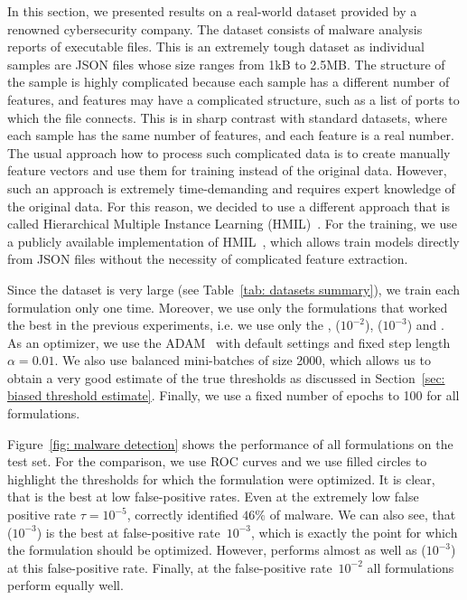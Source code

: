 In this section, we presented results on a real-world dataset provided by a renowned cybersecurity company. The dataset consists of malware analysis reports of executable files. This is an extremely tough dataset as individual samples are JSON files whose size ranges from 1kB to 2.5MB. The structure of the sample is highly complicated because each sample has a different number of features, and features may have a complicated structure, such as a list of ports to which the file connects. This is in sharp contrast with standard datasets, where each sample has the same number of features, and each feature is a real number. The usual approach how to process such complicated data is to create manually feature vectors and use them for training instead of the original data. However, such an approach is extremely time-demanding and requires expert knowledge of the original data. For this reason, we decided to use a different approach that is called Hierarchical Multiple Instance Learning (HMIL)~\cite{pevny2017using}. For the training, we use a publicly available implementation of HMIL~\cite{mandlik2021mill}, which allows train models directly from JSON files without the necessity of complicated feature extraction.

Since the dataset is very large (see Table~\ref{tab: datasets summary}), we train each formulation only one time. Moreover, we use only the formulations that worked the best in the previous experiments, i.e. we use only the \BaseLine, \PatMatNP($10^{-2}$), \PatMatNP($10^{-3}$) and \BaseLine. As an optimizer, we use the ADAM~\cite{kingma2014adam} with default settings and fixed step length~$\alpha = 0.01.$ We also use balanced mini-batches of size 2000, which allows us to obtain a very good estimate of the true thresholds as discussed in Section~\ref{sec: biased threshold estimate}. Finally, we use a fixed number of epochs to 100 for all formulations.

Figure~\ref{fig: malware detection} shows the performance of all formulations on the test set. For the comparison, we use ROC curves and we use filled circles to highlight the thresholds for which the formulation were optimized. It is clear, that \DeepTopPush is the best at low false-positive rates. Even at the extremely low false positive rate $\tau=10^{-5}$, \DeepTopPush correctly identified $46\%$ of malware. We can also see, that \PatMatNP($10^{-3}$) is the best at false-positive rate~$10^{-3}$, which is exactly the point for which the formulation should be optimized. However, \DeepTopPush performs almost as well as \PatMatNP($10^{-3}$) at this false-positive rate. Finally, at the false-positive rate~$10^{-2}$ all formulations perform equally well.

